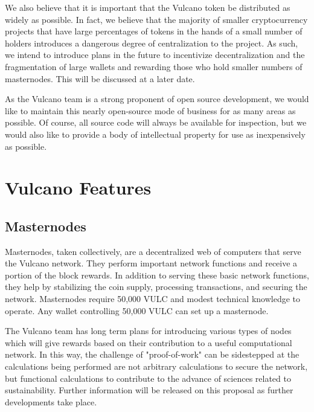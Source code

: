 \documentclass[A4paper, 12pt]{article}
\begin{document}
We also believe that it is important that the Vulcano token be distributed as widely as possible. In fact, we believe that the majority of smaller cryptocurrency projects that have large percentages of tokens in the hands of a small number of holders introduces a dangerous degree of centralization to the project. As such, we intend to introduce plans in the future to incentivize decentralization and the fragmentation of large wallets and rewarding those who hold smaller numbers of masternodes. This will be discussed at a later date. 

As the Vulcano team is a strong proponent of open source development, we would like to maintain this nearly open-source mode of business for as many areas as possible. Of course, all source code will always be available for inspection, but we would also like to provide a body of intellectual property for use as inexpensively as possible. 

\section{Vulcano Features}
\subsection {Masternodes}
Masternodes, taken collectively, are a decentralized web of computers that serve the Vulcano network. They perform important network functions and receive a portion of the block rewards. In addition to serving these basic network functions, they help by stabilizing the coin supply, processing transactions, and securing the network. Masternodes require 50,000 VULC and modest technical knowledge to operate. Any wallet controlling 50,000 VULC can set up a masternode. 

The Vulcano team has long term plans for introducing various types of nodes which will give rewards based on their contribution to a useful computational network. In this way, the challenge of "proof-of-work" can be sidestepped at the calculations being performed are not arbitrary calculations to secure the network, but functional calculations to contribute to the advance of sciences related to sustainability. Further information will be released on this proposal as further developments take place. 
\end{document}
